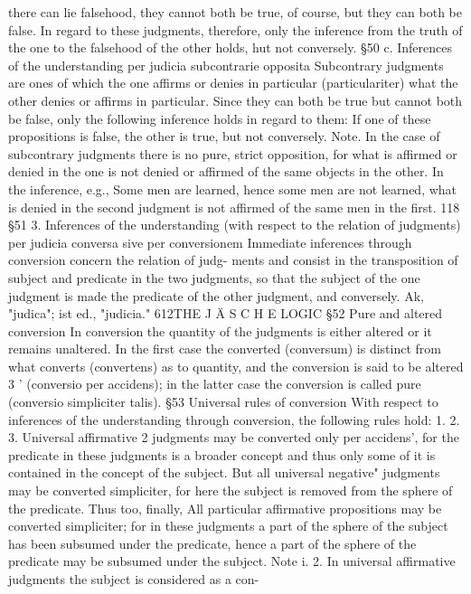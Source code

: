 there can lie falsehood, they cannot both be true, of course, but they can
both be false. In regard to these judgments, therefore, only the inference
from the truth of the one to the falsehood of the other holds, hut not conversely.
§50
c. Inferences of the understanding per judicia subcontrarie opposita
Subcontrary judgments are ones of which the one affirms or denies in
particular (particulariter) what the other denies or affirms in particular.
Since they can both be true but cannot both be false, only the following
inference holds in regard to them: If one of these propositions is false, the other
is true, but not conversely.
Note.
In the case of subcontrary judgments there is no pure, strict opposition, for
what is affirmed or denied in the one is not denied or affirmed of the same
objects in the other. In the inference, e.g., Some men are learned, hence
some men are not learned, what is denied in the second judgment is not
affirmed of the same men in the first.
118
§51
3. Inferences of the understanding (with respect to the relation of
judgments) per judicia conversa sive per conversionem
Immediate inferences through conversion concern the relation of judg-
ments and consist in the transposition of subject and predicate in the two
judgments, so that the subject of the one judgment is made the predicate
of the other judgment, and conversely.
Ak, "judica"; ist ed., "judicia."
612THE J Ä S C H E LOGIC
§52
Pure and altered conversion
In conversion the quantity of the judgments is either altered or it remains
unaltered. In the first case the converted (conversum) is distinct from what
converts (convertens) as to quantity, and the conversion is said to be altered 3 '
(conversio per accidens); in the latter case the conversion is called pure
(conversio simpliciter talis).
§53
Universal rules of conversion
With respect to inferences of the understanding through conversion, the
following rules hold:
1.
2.
3.
Universal affirmative 2 judgments may be converted only per accidens', for the
predicate in these judgments is a broader concept and thus only some of it is
contained in the concept of the subject.
But all universal negative" judgments may be converted simpliciter, for here the
subject is removed from the sphere of the predicate. Thus too, finally,
All particular affirmative propositions may be converted simpliciter; for in these
judgments a part of the sphere of the subject has been subsumed under the
predicate, hence a part of the sphere of the predicate may be subsumed under
the subject.
Note i.
2.
In universal affirmative judgments the subject is considered as a con-
